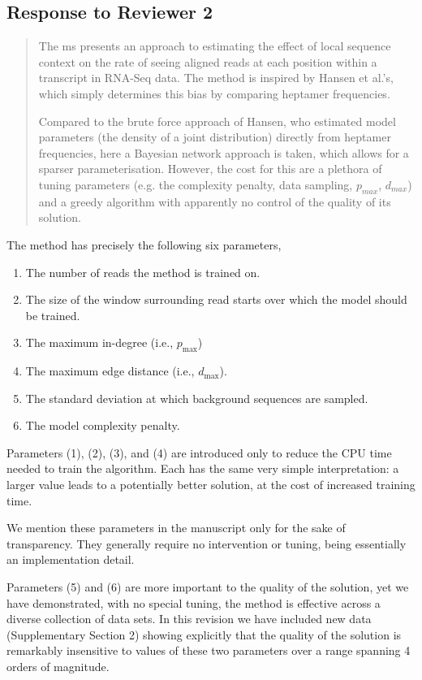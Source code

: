 \documentclass{article}
\begin{document}
\subsection*{Response to Reviewer 2}

\begin{quote}
The ms presents an approach to estimating the effect of local sequence
context on the rate of seeing aligned reads at each position within a
transcript in RNA-Seq data. The method is inspired by Hansen et al.'s,
which simply determines this bias by comparing heptamer frequencies.

Compared to the brute force approach of Hansen, who estimated model
parameters (the density of a joint distribution) directly from
heptamer frequencies, here a Bayesian network approach is taken, which
allows for a sparser parameterisation. However, the cost for this are
a plethora of tuning parameters (e.g. the complexity penalty, data
sampling, $p_{max}$, $d_{max}$) and a greedy algorithm with apparently no
control of the quality of its solution.
\end{quote}

The method has precisely the following six parameters,
\begin{enumerate}
\item The number of reads the method is trained on.
\item The size of the window surrounding read starts over which the model should
be trained.
\item The maximum in-degree (i.e., $p_{\text{max}}$)
\item The maximum edge distance (i.e., $d_{\text{max}}$).
\item The standard deviation at which background sequences are sampled.
\item The model complexity penalty.
\end{enumerate}

Parameters (1), (2), (3), and (4) are introduced only to reduce the CPU time
needed to train the algorithm. Each has the same very simple interpretation: a
larger value leads to a potentially better solution, at the cost of increased
training time. 

We mention these parameters in the manuscript only for the sake of transparency.
They generally require no intervention or tuning, being essentially an
implementation detail. 

Parameters (5) and (6) are more important to the quality of the solution, yet we
have demonstrated, with no special tuning, the method is effective across a
diverse collection of data sets. In this revision we have included new data
(Supplementary Section 2) showing explicitly that the quality of the solution is
remarkably insensitive to values of these two parameters over a range spanning 4
orders of magnitude. 
\end{document}
